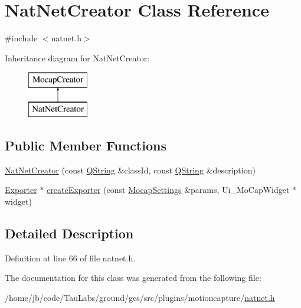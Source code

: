 \hypertarget{class_nat_net_creator}{\section{\-Nat\-Net\-Creator \-Class \-Reference}
\label{class_nat_net_creator}
}


{\ttfamily \#include $<$natnet.\-h$>$}

\-Inheritance diagram for \-Nat\-Net\-Creator\-:\begin{figure}[H]
\begin{center}
\leavevmode
\includegraphics[height=2.000000cm]{class_nat_net_creator}
\end{center}
\end{figure}
\subsection*{\-Public \-Member \-Functions}
\begin{DoxyCompactItemize}
\item 
\hyperlink{group___mo_cap_plugin_ga7eceb6d31ea96db4e00bdf9c6765b4b7}{\-Nat\-Net\-Creator} (const \hyperlink{group___u_a_v_objects_plugin_gab9d252f49c333c94a72f97ce3105a32d}{\-Q\-String} \&class\-Id, const \hyperlink{group___u_a_v_objects_plugin_gab9d252f49c333c94a72f97ce3105a32d}{\-Q\-String} \&description)
\item 
\hyperlink{class_exporter}{\-Exporter} $\ast$ \hyperlink{group___mo_cap_plugin_ga1d23a419317ce602e13c9dffd77de68a}{create\-Exporter} (const \hyperlink{group___mo_cap_plugin_ga6083347a5b3eb70e360f599354dc0f0b}{\-Mocap\-Settings} \&params, \-Ui\-\_\-\-Mo\-Cap\-Widget $\ast$widget)
\end{DoxyCompactItemize}


\subsection{\-Detailed \-Description}


\-Definition at line 66 of file natnet.\-h.



\-The documentation for this class was generated from the following file\-:\begin{DoxyCompactItemize}
\item 
/home/jb/code/\-Tau\-Labs/ground/gcs/src/plugins/motioncapture/\hyperlink{natnet_8h}{natnet.\-h}\end{DoxyCompactItemize}
